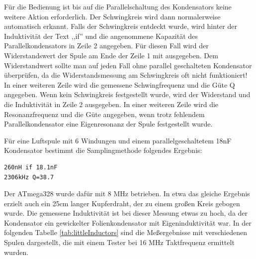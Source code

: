 Für die Bedienung ist bis auf die Parallelschaltung des Kondensators keine weitere
Aktion erforderlich. Der Schwingkreis wird dann normalerweise automatisch erkannt.
Falls der Schwingkreis entdeckt wurde, wird hinter der Induktivität der Text
,,if'' und die angenommene Kapazität des Parallelkondensators in Zeile 2 angegeben.
Für diesen Fall wird der Widerstandswert der Spule am Ende der Zeile 1 mit ausgegeben.
Dem Widerstandwert sollte man auf jeden Fall ohne parallel geschalteten Kondensator überprüfen,
da die Widerstandsmessung am Schwingkreis oft nicht funktioniert!
In einer weiteren Zeile wird die gemessene Schwingfrequenz und die Güte Q angegeben.
Wenn kein Schwingkreis festgestellt wurde, wird der Widerstand und die Induktivität
in Zeile 2 ausgegeben. In einer weiteren Zeile wird die Resonanzfrequenz und die
Güte angegeben, wenn trotz fehlendem Parallelkondensator eine Eigenresonanz der Spule
festgestellt wurde.

Für eine Luftspule mit 6 Windungen und einem parallelgeschaltetem 18nF Kondensator
bestimmt die Samplingmethode folgendes Ergebnis:

\begin{verbatim}
260nH if 18.1nF
2306kHz Q=38.7
\end{verbatim}

Der ATmega328 wurde dafür mit 8 MHz betrieben. In etwa das gleiche Ergebnis erzielt auch
ein 25cm langer Kupferdraht, der zu einem großen Kreis gebogen wurde.
Die gemessene Induktivität ist bei dieser Messung etwas zu hoch, da der Kondensator ein
gewickelter Folienkondensator mit Eigeninduktivität war.
In der folgenden Tabelle \ref{tab:littleInductors} sind die Meßergebnisse mit verschiedenen
Spulen dargestellt, die mit einem Tester bei 16 MHz Taktfrequenz ermittelt wurden.

